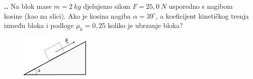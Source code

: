 

\noindent 
\textbf{
\thecjelina.\thezadatak.}
Na blok mase $m = 2\ kg$ djelujemo silom $F = 25,0\ N$
usporedno s nagibom kosine (kao na slici). Ako je kosina
nagiba $\alpha = 39^\circ$, a koeficijent kineti\v{c}kog trenja između
bloka i podloge $\mu_k = 0,25$ koliko je ubrzanje bloka?
\begin{figure}[h]%
  \begin{center}
    \includegraphics[width=0.3\textwidth]{Dinamika_materijalne_tocke/kosina.png}
  \end{center}
\end{figure}

